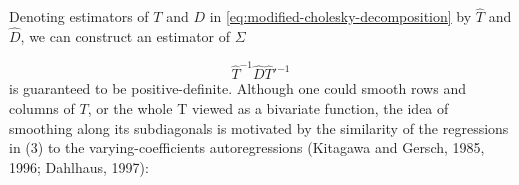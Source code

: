 \bigskip

Denoting estimators of $T$ and $D$ in \ref{eq:modified-cholesky-decomposition} by $\hat{T}$ and $\hat{D}$, we can construct an estimator of $\Sigma$ 

\begin{equation}
\hat{T}^{-1}\hat{D}\hat{T}'^{-1}
\end{equation}
\noindent
is guaranteed to be positive-definite. Although one could smooth rows and columns of $T$, or the whole T viewed as a bivariate function, the idea of smoothing along its subdiagonals is motivated by the similarity of the regressions in (3) to the varying-coefficients autoregressions (Kitagawa and Gersch, 1985, 1996; Dahlhaus, 1997):





